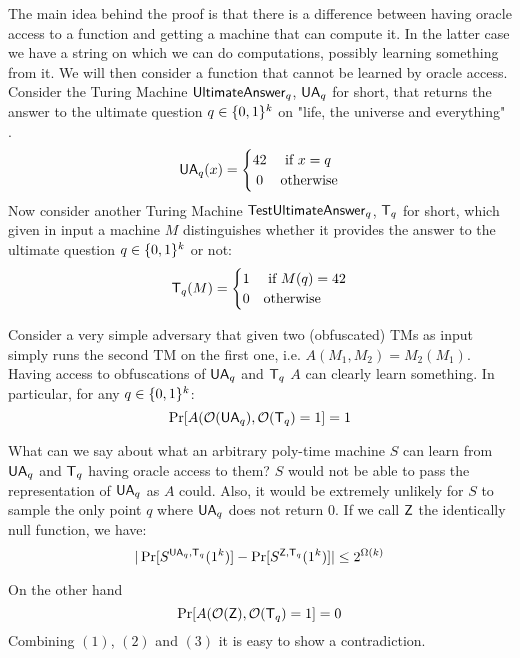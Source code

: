 The main idea behind the proof is that there is a difference between having oracle access to a function and getting a machine that can compute it. In the latter case we have a string on which we can do computations, possibly learning something from it.
We will then consider a function that cannot be learned by oracle access. Consider the Turing Machine
 $\mathsf{UltimateAnswer}_q$, $\mathsf{UA}_q$ for short, that returns the 
 answer to the ultimate question $q \in \{0,1\}^k$ on "life, the universe and everything" \cite{adams}.
\[
\UA_q(x) =
\begin{cases} 
\hfill 42    \hfill & \text{ if $x = q$} \\
\hfill 0 \hfill & \text{otherwise} \\
\end{cases}
\]
Now consider another Turing Machine $\mathsf{TestUltimateAnswer}_q$, $\mathsf{T}_q$ for short, which given in input a machine $M$ distinguishes whether it provides the answer to the ultimate question $q \in \{0,1\}^k$ or not:
\[
\T_q(M) =
\begin{cases} 
\hfill 1    \hfill & \text{ if $M(q) = 42$} \\
\hfill 0 \hfill & \text{otherwise} \\
\end{cases}
\]

Consider a very simple adversary that given two (obfuscated) TMs as input simply runs the second TM on the first one, i.e. $A(M_1, M_2) = M_2(M_1)$. Having access to obfuscations of $\mathsf{UA}_q$ and $\mathsf{T}_q$ $A$ can clearly learn something. In particular, for any $q \in \{0,1\}^k$:
\begin{equation} \Pr[A(\mathcal{O}(\mathsf{UA}_q), \mathcal{O}(\mathsf{T}_q) = 1] = 1 \end{equation}

What can we say about what an arbitrary poly-time machine $S$ can learn from $\mathsf{UA}_q$ and $\mathsf{T}_q$ having oracle access to them? $S$ would not be able to pass the representation of $\mathsf{UA}_q$ as $A$ could. Also, it would be extremely unlikely for $S$ to sample the only point $q$ where $\mathsf{UA}_q$ does not return $0$. If we call $\mathsf{Z}$ the identically null function, we have:
\begin{equation} |\Pr[S^{\mathsf{UA}_q, \mathsf{T}_q}(1^k)] - \Pr[S^{\mathsf{Z}, \mathsf{T}_q}(1^k)]| \leq 2^{\Omega(k)}\end{equation}

On the other hand \begin{equation} \Pr[A(\mathcal{O}(\mathsf{Z}), \mathcal{O}(\mathsf{T}_q) = 1] = 0 \end{equation}
Combining $(1)$, $(2)$ and $(3)$ it is easy to show a contradiction.

